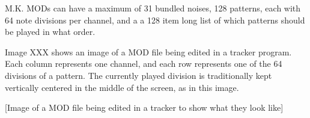 M.K. MODs can have a maximum of 31 bundled noises, 128 patterns, each with 64 note divisions per channel, and a a 128 item long list of which patterns should be played in what order.

Image XXX shows an image of a MOD file being edited in a tracker program.
Each column represents one channel, and each row represents one of the 64 divisions of a pattern.
The currently played division is traditionally kept vertically centered in the middle of the screen, as in this image.

[Image of a MOD file being edited in a tracker to show what they look like]